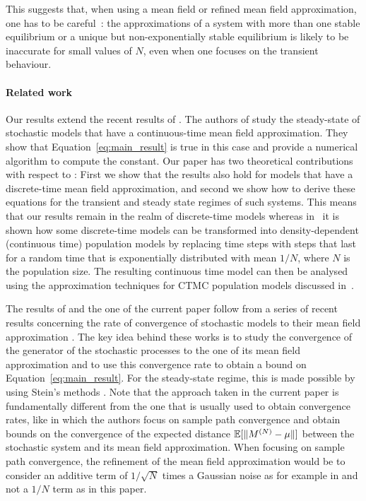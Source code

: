 \documentclass[review]{elsarticle}
\begin{document}
This suggests that, when using a mean field or refined mean field
approximation, one has to be careful~: the approximations of a system
with more than one stable equilibrium or a unique but
non-exponentially stable equilibrium is likely to be inaccurate for
small values of $N$, even when one focuses on the transient behaviour.

\paragraph*{Related work} Our results extend the recent results of
\cite{gast2017refined}. The authors of \cite{gast2017refined} study
the steady-state of stochastic models that have a continuous-time mean
field approximation. They show that Equation~\eqref{eq:main_result} is
true in this case and provide a numerical algorithm to compute the
constant. Our paper has two theoretical contributions with respect to
\cite{gast2017refined} : First we show that the results also hold for
models that have a discrete-time mean field approximation, and second
we show how to derive these equations for the transient and steady
state regimes of such systems.  This means that our results remain in
the realm of discrete-time models whereas in~\cite{gast2017refined} it
is shown how some discrete-time models can be transformed into
density-dependent (continuous time) population models by replacing
time steps with steps that last for a random time that is
exponentially distributed with mean $1/N$, where $N$ is the population
size. The resulting continuous time model can then be analysed using
the approximation techniques for CTMC population models discussed
in~\cite{gast2017refined}.

The results of \cite{gast2017refined} and the one of the current paper
follow from a series of recent results concerning the rate of
convergence of stochastic models to their mean field approximation
\cite{gast2017expected,ying2016rate,ying2017stein,kolokoltsov2011mean}. The
key idea behind these works is to study the convergence of the
generator of the stochastic processes to the one of its mean field
approximation and to use this convergence rate to obtain a bound on
Equation~\eqref{eq:main_result}.  For the steady-state regime, this is
made possible by using Stein's methods
\cite{stein1986approximate,braverman2017stein,braverman2017stein2}.
Note that the approach taken in the current paper is fundamentally
different from the one that is usually used to obtain convergence
rates, like \cite{gast2012markov,bortolussi2013bounds,gastgaujalDEDS}
in which the authors focus on sample path convergence and obtain
bounds on the convergence of the expected distance
$\esp{\norm{\MN-\mu}}$ between the stochastic system and its mean
field approximation. When focusing on sample path convergence, the
refinement of the mean field approximation would be to consider an
additive term of $1/\sqrt{N}$ times a Gaussian noise as for example in
\cite{gast2012markov} and not a $1/N$ term as in this paper.
\end{document}
